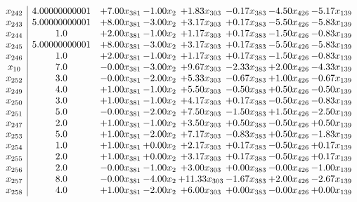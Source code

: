 \documentclass[8pt]{article}
\begin{document}
\[\begin{array}{c| c c@{\hskip 2pt} c@{\hskip 2pt} c@{\hskip 2pt} c@{\hskip 2pt} c@{\hskip 2pt} c@{\hskip 2pt} }
 x_{242}   &  4.00000000001 & +  7.00 x_{381} & -1.00 x_{2} & +  1.83 x_{303} & -0.17 x_{383} & -4.50 x_{426} & -5.17 x_{139}\\
 x_{243}   &  5.00000000001 & +  8.00 x_{381} & -3.00 x_{2} & +  3.17 x_{303} & +  0.17 x_{383} & -5.50 x_{426} & -5.83 x_{139}\\
 x_{244}   &  1.0 & +  2.00 x_{381} & -1.00 x_{2} & +  1.17 x_{303} & +  0.17 x_{383} & -1.50 x_{426} & -0.83 x_{139}\\
 x_{245}   &  5.00000000001 & +  8.00 x_{381} & -3.00 x_{2} & +  3.17 x_{303} & +  0.17 x_{383} & -5.50 x_{426} & -5.83 x_{139}\\
 x_{246}   &  1.0 & +  2.00 x_{381} & -1.00 x_{2} & +  1.17 x_{303} & +  0.17 x_{383} & -1.50 x_{426} & -0.83 x_{139}\\
 x_{10}   &  7.0 & -0.00 x_{381} & -3.00 x_{2} & +  9.67 x_{303} & -2.33 x_{383} & +  2.00 x_{426} & -4.33 x_{139}\\
 x_{252}   &  3.0 & -0.00 x_{381} & -2.00 x_{2} & +  5.33 x_{303} & -0.67 x_{383} & +  1.00 x_{426} & -0.67 x_{139}\\
 x_{249}   &  4.0 & +  1.00 x_{381} & -1.00 x_{2} & +  5.50 x_{303} & -0.50 x_{383} & +  0.50 x_{426} & -0.50 x_{139}\\
 x_{250}   &  3.0 & +  1.00 x_{381} & -1.00 x_{2} & +  4.17 x_{303} & +  0.17 x_{383} & -0.50 x_{426} & -0.83 x_{139}\\
 x_{251}   &  5.0 & -0.00 x_{381} & -2.00 x_{2} & +  7.50 x_{303} & -1.50 x_{383} & +  1.50 x_{426} & -2.50 x_{139}\\
 x_{247}   &  2.0 & +  1.00 x_{381} & -1.00 x_{2} & +  3.50 x_{303} & +  0.50 x_{383} & -0.50 x_{426} & +  0.50 x_{139}\\
 x_{253}   &  5.0 & +  1.00 x_{381} & -2.00 x_{2} & +  7.17 x_{303} & -0.83 x_{383} & +  0.50 x_{426} & -1.83 x_{139}\\
 x_{254}   &  1.0 & +  1.00 x_{381} & +  0.00 x_{2} & +  2.17 x_{303} & +  0.17 x_{383} & -0.50 x_{426} & +  0.17 x_{139}\\
 x_{255}   &  2.0 & +  1.00 x_{381} & +  0.00 x_{2} & +  3.17 x_{303} & +  0.17 x_{383} & -0.50 x_{426} & +  0.17 x_{139}\\
 x_{256}   &  2.0 & -0.00 x_{381} & -1.00 x_{2} & +  3.00 x_{303} & +  0.00 x_{383} & -0.00 x_{426} & -1.00 x_{139}\\
 x_{257}   &  8.0 & -0.00 x_{381} & -4.00 x_{2} & + 11.33 x_{303} & -1.67 x_{383} & +  2.00 x_{426} & -2.67 x_{139}\\
 x_{258}   &  4.0 & +  1.00 x_{381} & -2.00 x_{2} & +  6.00 x_{303} & +  0.00 x_{383} & -0.00 x_{426} & +  0.00 x_{139}\\

\end{array}\]
\end{document}
